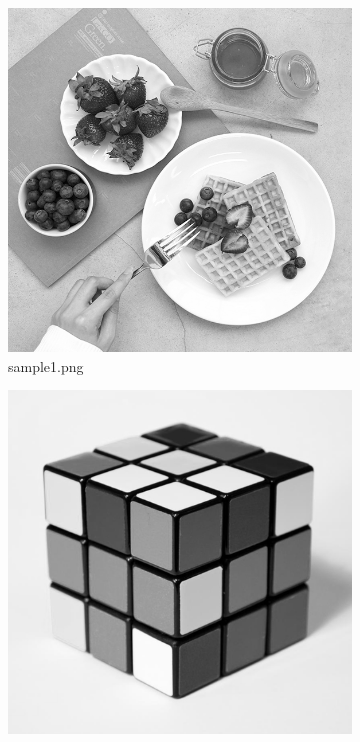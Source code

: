 \begin{figure}[H]
    \centering
    \begin{subfigure}[t]{.4\textwidth}
    \includegraphics[width=0.9\linewidth]{images/samples/sample1.png}
    \caption*{sample1.png}
    \centering
    \end{subfigure}
    \begin{subfigure}[t]{.4\textwidth}
    \centering
    \includegraphics[width=0.9\linewidth]{images/samples/sample2.png}

\end{subfigure}
\end{figure}
